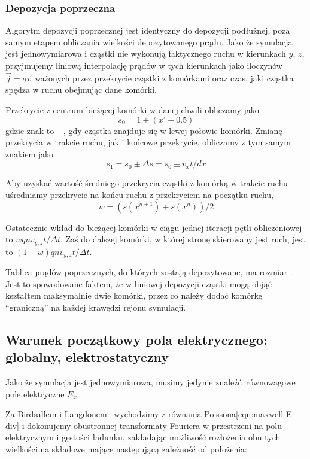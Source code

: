 \subsubsection{Depozycja poprzeczna}
Algorytm depozycji poprzecznej jest identyczny do depozycji podłużnej, poza samym etapem obliczania
wielkości depozytowanego prądu. Jako że symulacja jest jednowymiarowa i cząstki nie wykonują
faktycznego ruchu w kierunkach $y$, $z$, przyjmujemy liniową interpolację
prądów w tych kierunkach jako iloczynów $\vec{j}=q\vec{v}$ ważonych przez przekrycie
cząstki z komórkami oraz czas, jaki cząstka spędza w ruchu obejmując dane
komórki.

Przekrycie z centrum bieżącej komórki w danej chwili obliczamy jako
\begin{equation}
    s_0 = 1 \pm (x' + 0.5) 
\end{equation}
gdzie znak to $+$, gdy cząstka znajduje się w lewej połowie komórki. Zmianę
przekrycia w trakcie ruchu, jak i końcowe przekrycie, obliczamy z tym samym znakiem jako 
\begin{equation}
    s_1 = s_0 \pm \Delta s = s_0 \pm v_x t / dx
\end{equation}


Aby uzyskać wartość średniego przekrycia cząstki z komórką w trakcie ruchu
uśredniamy przekrycie na końcu ruchu z przekryciem na początku ruchu,
\begin{equation}
    w = \left(s(x^{n+1}) + s(x^n)\right)/{2}
\end{equation}

Ostatecznie wkład do bieżącej komórki w ciągu jednej iteracji pętli obliczeniowej
to $w q n v_{y, z} t / \Delta t$.
Zaś do dalszej komórki, w której stronę skierowany jest ruch, jest to  $(1-w) q n v_{y, z} t / \Delta t$.

Tablica prądów poprzecznych, do których zostają depozytowane, ma rozmiar
. Jest to spowodowane faktem, że w liniowej depozycji
cząstki mogą objąć kształtem maksymalnie dwie komórki, przez co należy dodać
komórkę ``graniczną'' na każdej krawędzi rejonu symulacji.

\subsection{Warunek początkowy pola elektrycznego:  globalny, elektrostatyczny}
Jako że symulacja jest jednowymiarowa, musimy jedynie znaleźć równowagowe pole
elektryczne $E_x$.

Za Birdsallem i Langdonem~\cite{birdsall} wychodzimy z równania Poissona\ref{eqn:maxwell-E-div} i dokonujemy
obustronnej transformaty Fouriera w przestrzeni na polu elektrycznym i gęstości ładunku,
zakładając możliwość rozłożenia obu tych wielkości na składowe mające następującą zależność
od położenia:

